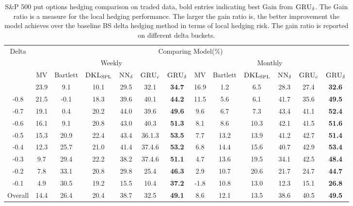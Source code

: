 \documentclass[letterpaper,12pt,titlepage,oneside,final]{book}
\numberwithin{equation}{section}
\theoremstyle{definition}
\newcommand{\model}{\textsc{GRU}_\delta}
\newcommand{\modelN}{\textsc{NN}_\delta}
\newcommand{\DKLs}{\bf\textsc{DKL}_{\text{SPL}}}
\begin{document}
\begin{table}[htp!]
	\centering
	\small
	\begin{threeparttable}
		\begin{tabular}{|c|cccccc| cccccc|}
			\hline
			\multirow{4}{*}{Delta}&\multicolumn{12}{c|}{Comparing Model(\%)}\\
			&\multicolumn{6}{c}{Weekly }&\multicolumn{6}{c|}{Monthly}\\ %
			&{\tiny MV}& {\tiny Bartlett}&\multicolumn{1}{c}{\tiny $\DKLs$}
			&\multicolumn{1}{c}{\tiny $\modelN$ } &\multicolumn{1}{c}{\tiny $\textsc{GRU}_{c}$} &\multicolumn{1}{c}{\tiny $\model$}
            &{\tiny MV}& {\tiny Bartlett} &\multicolumn{1}{c}{\tiny $\DKLs$}
            &\multicolumn{1}{c}{\tiny $\modelN$} &\multicolumn{1}{c}{\tiny $\textsc{GRU}_{c}$} & \multicolumn{1}{c|}{\tiny $\model$ } \\ \hline
			-0.9   &23.9  &9.1  &10.1   &29.5 &32.1 &\textbf{34.7}  &16.9 &1.2 &6.5   &28.3         & 27.4& \textbf{32.6}  \\

			-0.8   &21.5  &-0.1 &18.3   &39.6 &40.1 &\textbf{44.2}  &11.5 &5.6 &6.1   &41.7        &35.6 & \textbf{49.5}  \\

			-0.7   &19.1  &0.4  &20.2   &44.0 &39.6 &\textbf{49.6}  &9.6  &6.7 &7.3   &43.4        &41.1 & \textbf{52.4}  \\
			-0.6   &16.1  &9.1  &20.8   &43.0 &40.3 &\textbf{51.3}  &8.1  &8.6 &10.3  &42.1        &41.5 & \textbf{51.6}  \\
			-0.5   &15.3  &20.9 &22.4   &43.4&36.1.3 &\textbf{53.5}  &7.7  &13.2 &13.9  &41.2        &42.7 & \textbf{51.4}  \\
			-0.4   &12.3  &25.7 &21.0   &41.4&37.4.6 &\textbf{53.2}  &6.8  &14.4 &15.6  &40.7        &42.9 & \textbf{53.4}  \\
			-0.3   &9.7   &29.4 &22.2   &38.2&37.4.6 &\textbf{51.1}  &4.7  &13.6 &19.5  &34.1       &42.5  & \textbf{48.4}  \\
			-0.2   &7.8   &33.1 &20.8   &29.8 &25.4&\textbf{46.3}  &2.9  &10.7 &20.6  &21.7         & 24.7 &\textbf{44.7}  \\
			-0.1   &4.9   &30.5 &19.2   &15.5&10.4 &\textbf{37.2}  &-1.8 &10.8 &13.0  &12.3         &15.1& \textbf{26.8}  \\
			Overall&14.4  &26.4 &20.4   &38.7 &32.5&\textbf{49.1}  &8.6  &12.1 &13.5  &38.6        &40.5 & \textbf{49.5}  \\
			\hline
		\end{tabular}
		\caption{S\&P 500 put options hedging comparison on traded data, bold entries indicating best Gain from $\model$. The Gain ratio is a measure for the local hedging performance. The larger the gain ratio is, the better improvement the model achieves over the baseline BS delta hedging method in terms of local hedging risk. The gain ratio is reported on different delta buckets. }
\label{SP500PutC}
\end{threeparttable}
\end{table}
\end{document}
